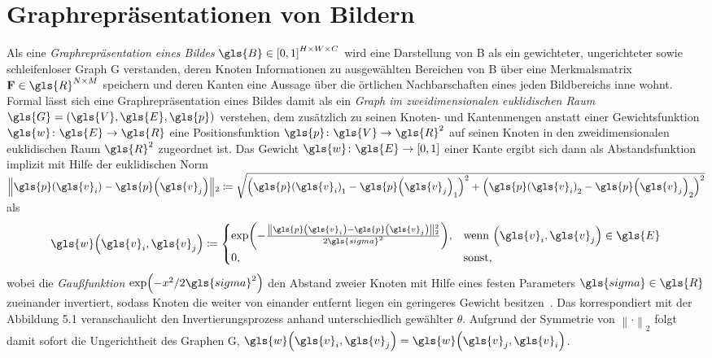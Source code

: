 \chapter{Graphrepräsentationen von Bildern}
\label{graphrepraesentationen_von_bildern}

Als eine \emph{Graphrepräsentation eines Bildes} $\gls{B} \in {\left[0, 1\right]}^{H \times W \times C}$ wird eine Darstellung von \gls{B} als ein gewichteter, ungerichteter sowie schleifenloser Graph \gls{G} verstanden, deren Knoten Informationen zu ausgewählten Bereichen von \gls{B} über eine Merkmalsmatrix $\ma{F} \in \gls{R}^{N \times M}$ speichern und deren Kanten eine Aussage über die örtlichen Nachbarschaften eines jeden Bildbereichs inne wohnt.
Formal lässt sich eine Graphrepräsentation eines Bildes damit als ein \emph{Graph im zweidimensionalen euklidischen Raum} $\gls{G} = \left(\gls{V}, \gls{E}, \gls{p}\right)$ verstehen, dem zusätzlich zu seinen Knoten- und Kantenmengen anstatt einer Gewichtsfunktion $\gls{w} \colon \gls{E} \to \gls{R}$ eine Positionsfunktion $\gls{p} \colon \gls{V} \to \gls{R}^2$ auf seinen Knoten in den zweidimensionalen euklidischen Raum $\gls{R}^2$ zugeordnet ist.
Das Gewicht $\gls{w} \colon \gls{E} \to \left[0, 1\right]$ einer Kante ergibt sich dann als Abstandsfunktion implizit mit Hilfe der euklidischen Norm $\left\|\gls{p}\left(\gls{v}_i\right) - \gls{p}\left(\gls{v}_j\right) \right\|_2 \coloneqq \sqrt{{\left({\gls{p}\left(\gls{v}_i\right)}_1 - {\gls{p}\left(\gls{v}_j\right)}_1\right)}^2 + {\left({\gls{p}\left(\gls{v}_i\right)}_2 - {\gls{p}\left(\gls{v}_j\right)}_2\right)}^2}$ als
\begin{equation}
  \gls{w}\left(\gls{v}_i, \gls{v}_j\right) \coloneqq \begin{cases}
    \exp\left(-\frac{\left\|\gls{p}\left(\gls{v}_i\right) - \gls{p}\left(\gls{v}_j\right)\right\|_2^2}{2\gls{sigma}^2}\right), & \text{wenn }\left(\gls{v}_i, \gls{v}_j\right) \in \gls{E}\\
    0, & \text{sonst},
  \end{cases}
  \label{gauss}
\end{equation}
wobei die \emph{Gaußfunktion} $\exp\left(-x^2 / 2 \gls{sigma}^2\right)$ den Abstand zweier Knoten mit Hilfe eines festen Parameters $\gls{sigma} \in \gls{R}$ zueinander invertiert, sodass Knoten die weiter von einander entfernt liegen ein geringeres Gewicht besitzen~\cite{Shuman}.
Das korrespondiert mit der
Abbildung 5.1 veranschaulicht den Invertierungsprozess anhand unterschiedlich gewählter $\theta$.
Aufgrund der Symmetrie von ${\left\|\cdot\right\|}_2$ folgt damit sofort die Ungerichtheit des Graphen \gls{G}, \dhe{} $\gls{w}\left(\gls{v}_i, \gls{v}_j\right) = \gls{w}\left(\gls{v}_j, \gls{v}_i\right)$.

